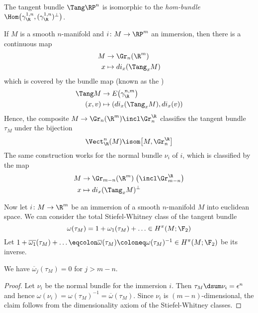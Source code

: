\begin{corollary}
	The tangent bundle $\Tang \RP^n$ is isomorphic to the \emph{hom-bundle} $\Hom\big(\gamma_\R^{1, n}, (\gamma_\R^{1, n})^\perp\big)$.
\end{corollary}
\begin{remark}
	If $M$ is a smooth $n$-manifold and $i\colon M \to \RP^m$ an immersion, then there is a continuous map
	\begin{align*}
		M &\to \Gr_n(\R^m) \\
		x &\mapsto d i_x(\Tang_x M)
	\end{align*}
	which is covered by the bundle map (known as the )
	\begin{align*}
		\Tang M &\to E\big(\gamma_\R^{n, m}\big) \\
		(x, v) &\mapsto (d i_x(\Tang_x M), d i_x(v))
	\end{align*}
	Hence, the composite $M \to \Gr_n(\R^m) \incl \Gr_n^\R$ classifies the tangent bundle $\tau_M$ under the bijection
	\begin{equation*}
		\Vect_\R^n(M) \isom \big[M, \Gr_n^\R\big]
	\end{equation*}
	The same construction works for the normal bundle $\nu_i$ of $i$, which is classified by the map
	\begin{align*}
		M &\to \Gr_{m - n}(\R^m)\;\big(\incl \Gr_{m - n}^\R\big) \\
		x &\mapsto d i_x(\Tang_x M)^\perp
	\end{align*}
\end{remark}

Now let $i\colon M \to \R^m$ be an immersion of a smooth $n$-manifold $M$ into euclidean space.
We can consider the total Stiefel-Whitney class of the tangent bundle
\begin{equation*}
	\omega(\tau_M) = 1 + \omega_1(\tau_M) + \ldots \in H^\pi(M; \F_2)
\end{equation*}
Let $1 + \overline{\omega_1}(\tau_M) + \ldots \eqcolon \overline{\omega}(\tau_M) \coloneq \omega(\tau_M)^{-1} \in H^\pi(M; \F_2)$ be its inverse.
\begin{proposition}\label{prop:vanishingomegainverse}
	We have $\overline{\omega}_j(\tau_M) = 0$ for $j > m - n$.
\end{proposition}
\begin{proof}
	Let $\nu_i$ be the normal bundle for the immersion $i$.
	Then $\tau_M \dsum \nu_i = \epsilon^n$ and hence $\omega(\nu_i) = \omega(\tau_M)^{-1} = \overline{\omega}(\tau_M)$.
	Since $\nu_i$ is $(m - n)$-dimensional, the claim follows from the dimensionality axiom of the Stiefel-Whitney classes.
\end{proof}

